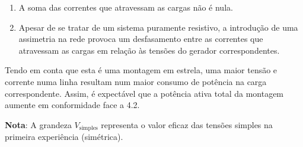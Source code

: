 \begin{enumerate}
    \item A soma das correntes que atravessam as cargas não é nula.
    \item Apesar de se tratar de um sistema puramente resistivo, a introdução de uma assimetria na rede provoca um desfasamento entre as correntes que atravessam as cargas em relação às tensões do gerador correspondentes.
\end{enumerate}

\noindent Tendo em conta que esta é uma montagem em estrela, uma maior tensão e corrente numa linha resultam num maior consumo de potência na carga correspondente. Assim, é expectável que a potência ativa total da montagem aumente em conformidade face a 4.2.

\noindent \textbf{Nota}: A grandeza $V_\text{simples}$ representa o valor eficaz das tensões simples na primeira experiência (simétrica).

